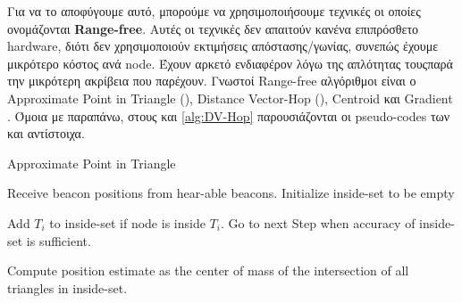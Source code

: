 Για να το αποφύγουμε αυτό, μπορούμε να χρησιμοποιήσουμε τεχνικές οι οποίες ονομάζονται \textbf{Range-free}. 
Αυτές οι τεχνικές δεν απαιτούν κανένα επιπρόσθετο hardware, διότι δεν χρησιμοποιούν εκτιμήσεις απόστασης/γωνίας, συνεπώς έχουμε μικρότερο κόστος ανά node. 
Έχουν αρκετό ενδιαφέρον λόγω της απλότητας τους\udot παρά την μικρότερη ακρίβεια που παρέχουν. Γνωστοί Range-free αλγόριθμοι είναι 
ο Approximate Point in Triangle (), 
Distance Vector-Hop (), Centroid και Gradient \cite{range-distributed}.
Όμοια με παραπάνω, στους  και \ref{alg:DV-Hop} παρουσιάζονται οι pseudo-codes 
των  και  αντίστοιχα.

\begin{algorithm}[H]
	\caption[Approximate Point in Triangle]{Approximate Point in Triangle \cite{localization-algorithms}}\label{alg:APIT}
	\begin{algorithmic}[1]
			\State Receive beacon positions from hear-able beacons.
			\State Initialize inside-set to be empty
			
				\State Add $T_i$ to inside-set if node is inside $T_i$.
					Go to next Step when accuracy
					\newline\hspace*{1.5em}of inside-set is sufficient.
			\EndFor
			
			\State Compute position estimate as the center of mass of the intersection of all 
			\newline triangles in inside-set.	
	\end{algorithmic}
\end{algorithm}

